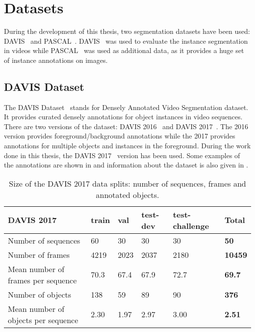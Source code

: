 \section{Datasets}

During the development of this thesis, two segmentation datasets have been used: DAVIS~\davisboth{} and PASCAL~\pascal{}.
DAVIS~\davisboth{} was used to evaluate the instance segmentation in videos while PASCAL~\pascal{} was used as additional data, as it provides a huge set of instance annotations on images.

\subsection{DAVIS Dataset}

The DAVIS Dataset~\davisboth{} stands for Densely Annotated Video Segmentation dataset.
It provides curated densely annotations for object instances in video sequences.
There are two versions of the dataset: DAVIS 2016~\davisold{} and DAVIS 2017~\davislast{}.
The 2016 version provides foreground/background annotations while the 2017 provides annotations for multiple objects and instances in the foreground.
During the work done in this thesis, the DAVIS 2017~\davislast{} version has been used.
Some examples of the annotations are shown in  and information about the dataset is also given in .

\begin{table}[h]
  \centering
  \begin{tabular}{l|llll|l}
    \toprule
    DAVIS 2017                          & train & val  & test-dev & test-challenge & \textbf{Total} \\
    \midrule
    Number of sequences                 & 60    & 30   & 30       & 30             & \textbf{50}    \\
    Number of frames                    & 4219  & 2023 & 2037     & 2180           & \textbf{10459} \\
    Mean number of frames per sequence  & 70.3  & 67.4 & 67.9     & 72.7           & \textbf{69.7}  \\
    Number of objects                   & 138   & 59   & 89       & 90             & \textbf{376}   \\
    Mean number of objects per sequence & 2.30  & 1.97 & 2.97     & 3.00           & \textbf{2.51} \\
    \bottomrule
  \end{tabular}
  \caption{Size of the DAVIS 2017 data splits: number of sequences, frames and annotated objects.}
  \label{tab:datasets:davis}
\end{table}

